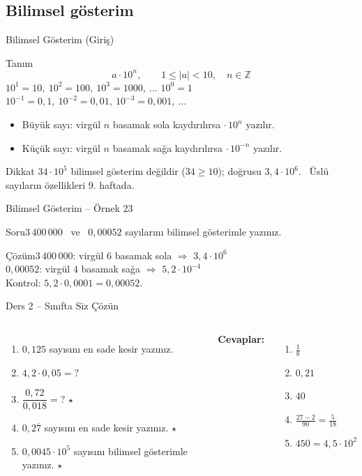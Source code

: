 \documentclass[aspectratio=169,11pt]{beamer}
\newcommand{\soru}[3]{%
\begin{frame}{#1}
  \begin{block}{Soru}\large #2\end{block}
  \pause
  \begin{exampleblock}{Çözüm}\large #3\end{exampleblock}
\end{frame}}
\newcommand{\ab}[1]{\overline{#1}}
\begin{document}
\subsection{Bilimsel gösterim}
\begin{frame}{Bilimsel Gösterim (Giriş)}
\begin{block}{Tanım}
\[a\cdot 10^{n},\qquad 1\le |a|<10,\quad n\in\mathbb{Z}\]
\(10^{1}=10,\ 10^{2}=100,\ 10^{3}=1000,\ \dots\) \qquad \(10^{0}=1\) \qquad \(10^{-1}=0{,}1,\ 10^{-2}=0{,}01,\ 10^{-3}=0{,}001,\ \dots\)
\begin{itemize}
\item Büyük sayı: virgül \(n\) basamak sola kaydırılırsa \(\cdot\,10^{n}\) yazılır.
\item Küçük sayı: virgül \(n\) basamak sağa kaydırılırsa \(\cdot\,10^{-n}\) yazılır.
\end{itemize}
\end{block}
\begin{alertblock}{Dikkat}
\(34\cdot 10^{5}\) bilimsel gösterim değildir (\(34\ge 10\)); doğrusu \(3{,}4\cdot 10^{6}\). \ Üslü sayıların özellikleri 9. haftada.
\end{alertblock}
\end{frame}

\soru{Bilimsel Gösterim -- Örnek 23}
{\(3\,400\,000\) \ ve \ \(0{,}00052\) sayılarını bilimsel gösterimle yazınız.}
{\(3\,400\,000\): virgül \(6\) basamak sola \(\Rightarrow\) \(3{,}4\cdot 10^{6}\)\\[4pt]
\(0{,}00052\): virgül \(4\) basamak sağa \(\Rightarrow\) \(5{,}2\cdot 10^{-4}\)\\[4pt]
Kontrol: \(5{,}2\cdot 0{,}0001=0{,}00052\).}

\begin{frame}{Ders 2 -- Sınıfta Siz Çözün}
\begin{columns}[t]
\begin{enumerate}
\item \(0{,}125\) sayısını en sade kesir yazınız.
\item \(4{,}2\cdot 0{,}05=?\)
\item \(\dfrac{0{,}72}{0{,}018}=?\) \(\star\)
\item \(0{,}2\ab{7}\) sayısını en sade kesir yazınız. \(\star\)
\item \(0{,}0045\cdot 10^{5}\) sayısını bilimsel gösterimle yazınız. \(\star\)
\end{enumerate}
\pause
\textbf{Cevaplar:}
\begin{enumerate}
\item \(\frac{1}{8}\)
\item \(0{,}21\)
\item \(40\)
\item \(\frac{27-2}{90}=\frac{5}{18}\)
\item \(450=4{,}5\cdot 10^{2}\)
\end{enumerate}
\end{columns}
\vspace{4pt}{\footnotesize \(\star\) işaretli soruların adım adım çözümü sonraki slaytlardadır.}
\end{frame}
\end{document}
